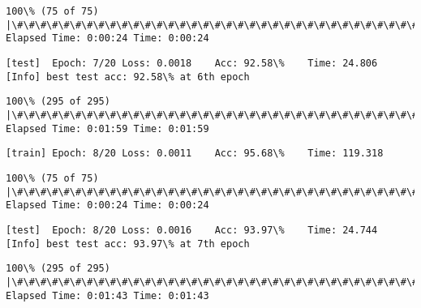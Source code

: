 \documentclass[11pt]{article}
\begin{document}
    \begin{Verbatim}[commandchars=\\\{\}]
100\% (75 of 75) |\#\#\#\#\#\#\#\#\#\#\#\#\#\#\#\#\#\#\#\#\#\#\#\#\#\#\#\#\#\#\#\#\#\#\#\#\#\#\#\#\#\#\#\#\#\#\#\#\#\#\#\#\#\#\#\#\#\#\#\#\#\#\#\#\#| Elapsed Time: 0:00:24 Time: 0:00:24

    \end{Verbatim}

    \begin{Verbatim}[commandchars=\\\{\}]
[test]	Epoch: 7/20	Loss: 0.0018	Acc: 92.58\%	Time: 24.806
[Info] best test acc: 92.58\% at 6th epoch

    \end{Verbatim}

    \begin{Verbatim}[commandchars=\\\{\}]
100\% (295 of 295) |\#\#\#\#\#\#\#\#\#\#\#\#\#\#\#\#\#\#\#\#\#\#\#\#\#\#\#\#\#\#\#\#\#\#\#\#\#\#\#\#\#\#\#\#\#\#\#\#\#\#\#\#\#\#\#\#\#\#\#\#\#\#\#| Elapsed Time: 0:01:59 Time: 0:01:59

    \end{Verbatim}

    \begin{Verbatim}[commandchars=\\\{\}]
[train]	Epoch: 8/20	Loss: 0.0011	Acc: 95.68\%	Time: 119.318

    \end{Verbatim}

    \begin{Verbatim}[commandchars=\\\{\}]
100\% (75 of 75) |\#\#\#\#\#\#\#\#\#\#\#\#\#\#\#\#\#\#\#\#\#\#\#\#\#\#\#\#\#\#\#\#\#\#\#\#\#\#\#\#\#\#\#\#\#\#\#\#\#\#\#\#\#\#\#\#\#\#\#\#\#\#\#\#\#| Elapsed Time: 0:00:24 Time: 0:00:24

    \end{Verbatim}

    \begin{Verbatim}[commandchars=\\\{\}]
[test]	Epoch: 8/20	Loss: 0.0016	Acc: 93.97\%	Time: 24.744
[Info] best test acc: 93.97\% at 7th epoch

    \end{Verbatim}

    \begin{Verbatim}[commandchars=\\\{\}]
100\% (295 of 295) |\#\#\#\#\#\#\#\#\#\#\#\#\#\#\#\#\#\#\#\#\#\#\#\#\#\#\#\#\#\#\#\#\#\#\#\#\#\#\#\#\#\#\#\#\#\#\#\#\#\#\#\#\#\#\#\#\#\#\#\#\#\#\#| Elapsed Time: 0:01:43 Time: 0:01:43

    \end{Verbatim}
\end{document}
